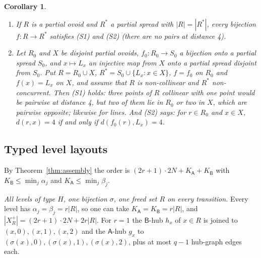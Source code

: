 \documentclass[11pt]{amsart}
\newtheorem{corollary}[theorem]{Corollary}
\theoremstyle{definition}
\theoremstyle{remark}
\numberwithin{equation}{section}
\begin{document}
\begin{corollary}\label{cor:mirror}
\begin{enumerate}[label=(\alph*)]
\item If $R$ is a partial ovoid and $R^*$ a partial spread with $|R|=|R^*|$, every bijection $f:R\to R^*$ satisfies (S1)
  and (S2) (there are no pairs at distance 4).
\item Let $R_0$ and $X$ be disjoint partial ovoids, $f_0:R_0\to S_0$ a bijection onto a partial spread $S_0$, and $x\mapsto
  L_x$ an injective map from $X$ onto a partial spread disjoint from $S_0$. Put $R=R_0\cup X$, $R^*=S_0\cup\{L_x:x\in X\}$,
  $f=f_0$ on $R_0$ and $f(x)=L_x$ on $X$, and assume that $R$ is non-collinear and $R^*$ non-concurrent. Then (S1) holds:
  three points of $R$ collinear with one point would be pairwise at distance 4, but two of them lie in $R_0$ or two in $X$,
  which are pairwise opposite; likewise for lines. And (S2) says: for $r\in R_0$ and $x\in X$, $d(r,x)=4$ if and only if
  $d(f_0(r),L_x)=4$.
\end{enumerate}
\end{corollary}

\subsection{Typed level layouts}
By Theorem~\ref{thm:assembly} the order is $(2r+1)\cdot2N+K_{\mathsf A}+K_{\mathsf B}$ with
$K_{\mathsf B}\le\min_j\alpha_j$ and $K_{\mathsf A}\le\min_j\beta_j$.

\emph{All levels of type $H$, one bijection $\sigma$, one freed set $R$ on every transition.} Every level has
$\alpha_j=\beta_j=r|R|$, so one can take $K_{\mathsf A}=K_{\mathsf B}=r|R|$, and $|X^+_R|=(2r+1)\cdot2N+2r|R|$. For $r=1$ the
$\mathsf B$-hub $h_x$ of $x\in R$ is joined to $(x,0),(x,1),(x,2)$ and the $\mathsf A$-hub $g_x$ to
$(\sigma(x),0),(\sigma(x),1),(\sigma(x),2)$, plus at most $q-1$ hub-graph edges each.
\end{document}
